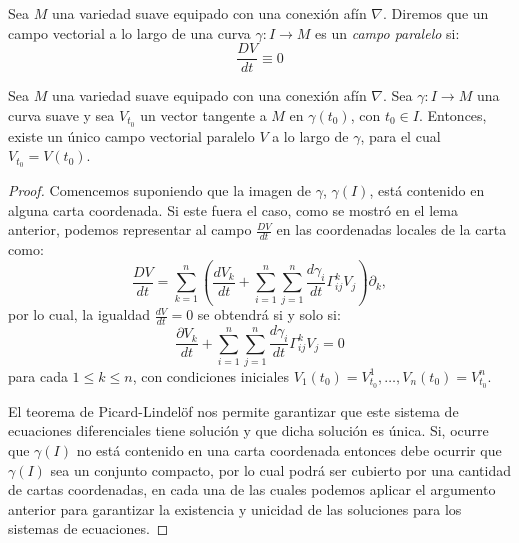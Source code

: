\begin{definition}
  Sea $M$ una variedad suave equipado con una conexión afín $\nabla$. Diremos que un campo vectorial a lo largo de una curva $\gamma: I \to M$ es un \textit{campo paralelo} si:
  \[
    \frac{DV}{dt} \equiv 0
  \]
\end{definition}

\begin{theorem}\label{Teorema: Existencia y Unicidad de Campos Paralelos}
  Sea $M$ una variedad suave equipado con una conexión afín $\nabla$. Sea $\gamma: I \to M$ una curva suave y sea $V_{t_{0}}$ un vector tangente a $M$ en $\gamma(t_{0})$, con $t_{0} \in I$. Entonces, existe un único campo vectorial paralelo $V$ a lo largo de $\gamma$, para el cual $V_{t_{0}} = V(t_{0})$.
\end{theorem}

\begin{proof}
  Comencemos suponiendo que la imagen de $\gamma$, $\gamma(I)$, está contenido en alguna carta coordenada. Si este fuera el caso, como se mostró en el lema anterior, podemos representar al campo $\frac{DV}{dt}$ en las coordenadas locales de la carta como:
	\[
		\frac{DV}{dt} = \sum_{k=1}^{n} \left(\frac{dV_{k}}{dt}
		+ \sum_{i=1}^{n}\sum_{j=1}^{n} \frac{d\gamma_{i}}{dt} \Gamma_{ij}^{k} V_{j}\right) \partial_{k},
	\]
  por lo cual, la igualdad $\frac{dV}{dt} = 0$ se obtendrá si y solo si:
  \[
    \frac{\partial V_{k}}{dt} + \sum_{i=1}^{n}\sum_{j=1}^{n} \frac{d\gamma_{i}}{dt} \Gamma_{ij}^{k} V_{j} = 0
  \]
  para cada $1 \leq k \leq n$, con condiciones iniciales $V_{1}(t_{0}) = V^{1}_{t_{0}}, \ldots, V_{n}(t_{0}) = V^{n}_{t_0}$. 

  El teorema de Picard-Lindelöf nos permite garantizar que este sistema de ecuaciones diferenciales tiene solución y que dicha solución es única. Si, ocurre que $\gamma(I)$ no está contenido en una carta coordenada entonces debe ocurrir que $\gamma(I)$ sea un conjunto compacto, por lo cual podrá ser cubierto por una cantidad de cartas coordenadas, en cada una de las cuales podemos aplicar el argumento anterior para garantizar la existencia y unicidad de las soluciones para los sistemas de ecuaciones.
\end{proof}
